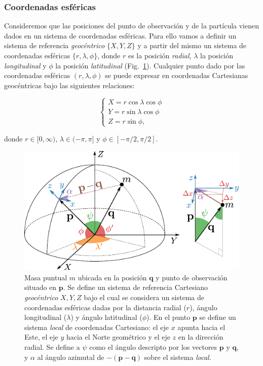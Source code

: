 \subsubsection{Coordenadas esféricas}

Consideremos que las posiciones del punto de observación y de la partícula
vienen dados en un sistema de coordenadas esféricas. Para ello vamos a definir
un sistema de referencia \emph{geocéntrico} $\{X, Y, Z\}$ y a partir del mismo
un sistema de coordenadas esféricas $\{r, \lambda, \phi\}$, donde $r$ es la
posición \emph{radial}, $\lambda$ la posición \emph{longitudinal} y $\phi$ la
posición \emph{latitudinal} (Fig.~\ref{fig:spherical-coordinates}).
Cualquier punto dado por las coordenadas esféricas $(r, \lambda, \phi)$ se
puede expresar en coordenadas Cartesianas geocéntricas bajo las siguientes
relaciones:

\begin{equation}
    \begin{cases}
        X = r \cos\lambda \cos{\phi} \\
        Y = r \sin\lambda \cos{\phi} \\
        Z = r \sin{\phi},
    \end{cases}
\end{equation}

\noindent donde $r \in [0, \infty)$, $\lambda \in (-\pi, \pi]$ y
$\phi \in [-\pi/2, \pi/2]$.

\begin{figure}
    \centering
    \includegraphics[width=\linewidth]{figs/spherical-coordinates.pdf}
    \caption{
        Masa puntual $m$ ubicada en la posición $\mathbf{q}$ y punto de
        observación situado en $\mathbf{p}$.
        Se define un sistema de referencia Cartesiano \emph{geocéntrico} $X, Y,
        Z$ bajo el cual se considera un sistema de coordenadas esféricas dadas
        por la distancia radial ($r$), ángulo longitudinal ($\lambda$) y ángulo
        latitudinal ($\phi$).
        En el punto $\mathbf{p}$ se define un sistema \emph{local} de
        coordenadas Cartesiano: el eje $x$ apunta hacia el Este,
        el eje $y$ hacia el Norte geométrico y el eje $z$ en la dirección
        radial.
        Se define a $\psi$ como el ángulo descripto por los vectores
        $\mathbf{p}$ y $\mathbf{q}$, y $\alpha$ al ángulo azimutal de
        $-(\mathbf{p} - \mathbf{q})$ sobre el sistema \emph{local}.
    }
    \label{fig:spherical-coordinates}
\end{figure}

